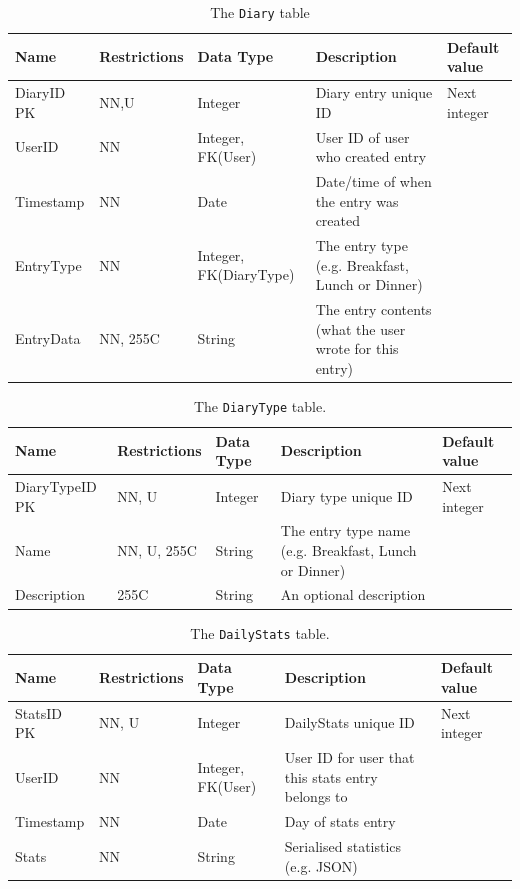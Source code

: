 \documentclass[a4paper, 11pt, titlepage]{article}
\begin{document}
\begin{table}[H]
  \centering
  \caption{The \texttt{Diary} table}
    \begin{tabularx}{\textwidth}{llp{2.5cm}Xl}
    \hline
    Name  & Restrictions & Data Type & Description & Default value \\
    \hline
    DiaryID PK & NN,U  & Integer & Diary entry unique ID & Next integer \\
    UserID & NN    & Integer, FK(User) & User ID of user who created entry &  \\
    Timestamp & NN    & Date  & Date/time of when the entry was created &  \\
    EntryType & NN    & Integer, FK(DiaryType) & The entry type (e.g. Breakfast, Lunch or Dinner) &  \\
    EntryData & NN, 255C & String & The entry contents (what the user wrote for this entry) &  \\
    \hline
    \end{tabularx}%
  \label{tab:dd:Diary}%
\end{table}%


\begin{table}[H]
  \centering
  \caption{The \texttt{DiaryType} table.}
    \begin{tabularx}{\textwidth}{lllXl}
    \hline
    Name  & Restrictions & Data Type & Description & Default value \\
    \hline
    DiaryTypeID PK & NN, U & Integer & Diary type unique ID & Next integer \\
    Name  & NN, U, 255C & String & The entry type name (e.g. Breakfast, Lunch or Dinner) &  \\
    Description & 255C  & String & An optional description &  \\
    \hline
    \end{tabularx}%
  \label{tab:dd:DiaryType}%
\end{table}%


\begin{table}[H]
  \centering
  \caption{The \texttt{DailyStats} table.}
    \begin{tabularx}{\textwidth}{llp{2.5cm}Xl}
    \hline
    Name  & Restrictions & Data Type & Description & Default value \\
    \hline
    StatsID PK & NN, U & Integer & DailyStats unique ID & Next integer \\
    UserID & NN    & Integer, FK(User) & User ID for user that this stats entry belongs to &  \\
    Timestamp & NN    & Date  & Day of stats entry &  \\
    Stats & NN    & String & Serialised statistics (e.g. JSON) &  \\
    \hline
    \end{tabularx}%
  \label{tab:dd:DailyStats}%
\end{table}%
\end{document}
